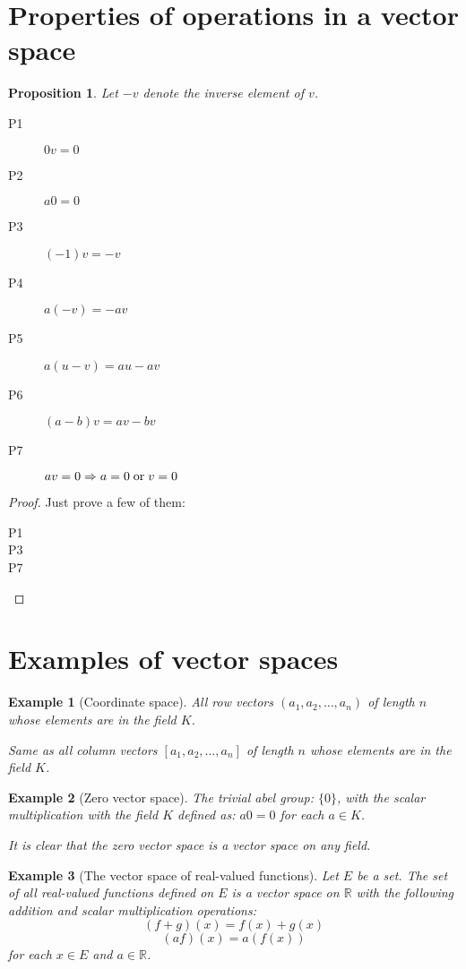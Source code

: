 \documentclass[onecolumn]{ctexart}
\newcommand*\textinmath[1]{\thickspace\textnormal{#1}\thickspace}
\newtheorem{proposition}{Proposition}
\newtheorem{example}{Example}
\begin{document}
\section{Properties of operations in a vector space}

\begin{proposition}
  Let $-v$ denote the inverse element of $v$.
  \begin{description}
    \item[P1] $0v = 0$
    \item[P2] $a0 = 0$
    \item[P3] $(-1)v = -v$
    \item[P4] $a(-v) = -av$
    \item[P5] $a(u - v) = au - av$
    \item[P6] $(a - b)v = av - bv$
    \item[P7] $av = 0 \Rightarrow a = 0 \textinmath{or} v = 0$ 
  \end{description}
\end{proposition}
\begin{proof}
  Just prove a few of them:
  \begin{description}
    \item[P1] 
    \item[P3] 
    \item[P7] 
  \end{description}
\end{proof}

\section{Examples of vector spaces}

\begin{example}[Coordinate space]
  All row vectors $(a_1, a_2, \ldots, a_n)$ of length $n$ whose elements are in the field $K$.

  Same as all column vectors $[a_1, a_2, \ldots, a_n]$ of length $n$ whose elements 
  are in the field $K$.
\end{example}

\begin{example}[Zero vector space]
  The trivial abel group: $\lbrace 0 \rbrace$, with the scalar multiplication 
  with the field $K$ defined as: $a0 = 0$ for each $a \in K$.

  It is clear that the zero vector space is a vector space on any field.
\end{example}

\begin{example}[The vector space of real-valued functions]
  Let $E$ be a set. The set of all real-valued functions defined on $E$ is a vector 
  space on $\mathbb{R}$ with the following addition and scalar multiplication 
  operations:
  \[
    (f + g)(x) = f(x) + g(x)   
  \]
  \[
    (af)(x) = a(f(x))
  \]
  for each $x \in E$ and $a \in \mathbb{R}$.
\end{example}
\end{document}
